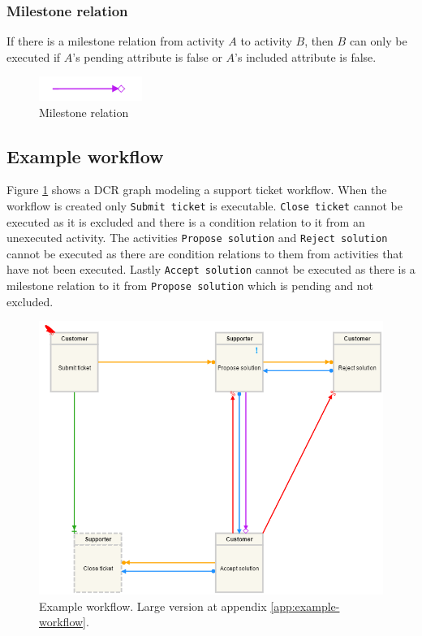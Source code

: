 \documentclass{article}
\begin{document}
			\subsubsection{Milestone relation}
			If there is a milestone relation from activity $A$ to activity $B$, then $B$ can only be executed if $A$'s pending attribute is false or $A$'s included attribute is false.
			\begin{figure}[!ht]
				\centering
				\includegraphics[width=0.3\textwidth]{figures/MilestoneRelation.png}
			 	\caption[Milestone relation]
			 	{Milestone relation}
			\end{figure}		

		\subsection{Example workflow}
		Figure \ref{fig:exampleWorkflow} shows a DCR graph modeling a support ticket workflow. When the workflow is created only \texttt{Submit ticket} is executable. 
		\texttt{Close ticket} cannot be executed as it is excluded and there is a condition relation to it from an unexecuted activity.
		The activities \texttt{Propose solution} and \texttt{Reject solution} cannot be executed as there are condition relations to them from activities that have not been executed. 
		Lastly \texttt{Accept solution} cannot be executed as there is a milestone relation to it from \texttt{Propose solution} which is pending and not excluded.

		\begin{figure}[!ht]
			\centering
			\includegraphics[width=\textwidth]{figures/exampleWorkflow.png}
		 	\caption[Example workflow]
		 	{Example workflow. Large version at appendix \ref{app:example-workflow}.}
		 	\label{fig:exampleWorkflow}
		\end{figure}
		\FloatBarrier
\end{document}
